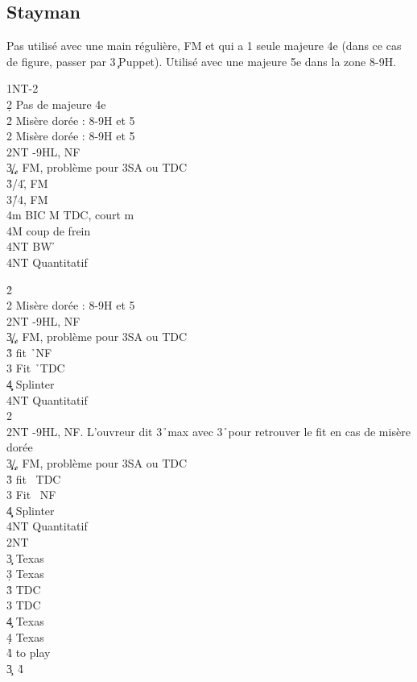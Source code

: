 \documentclass[a4paper]{article}
\begin{document}
\subsection{Stayman}

Pas utilisé avec une main régulière, FM et qui a 1 seule majeure 4e (dans ce cas de figure, passer par 3\c\ Puppet).
Utilisé avec une majeure 5e dans la zone 8-9H.

\begin{bidtable}
1NT-2\c\\
2\d \> Pas de majeure 4e\+\\
2\h \> Misère dorée : 8-9H et 5\h \\
2\s \> Misère dorée : 8-9H et 5\s \\
2NT -9HL, NF\\
3\c\d {}\c /\d , FM, problème pour 3SA ou TDC\\
3\h {}\s /4\h , FM\\
3\s {}\h /4\s , FM\\
4m \> BIC M TDC, court m\+\\
4M \> coup de frein\\
4NT \> BW \h \-\\
4NT \> Quantitatif\-
\end{bidtable}

\begin{bidtable}
2\h\+\\
2\s \> Misère dorée : 8-9H et 5\s \\
2NT -9HL, NF\\
3\c\d {}\c /\d , FM, problème pour 3SA ou TDC\\
3\h \> fit \h\ NF\\
3\s \> Fit \h\ TDC\\
4\c\d \> Splinter\\
4NT \> Quantitatif\-\\
2\s\+\\
2NT -9HL, NF. L'ouvreur dit 3\h\ max avec 3\h\ pour retrouver le fit en cas de misère dorée\\
3\c\d {}\c /\d , FM, problème pour 3SA ou TDC\\
3\h \> fit \s\ TDC\\
3\s \> Fit \s\ NF\\
4\c\d \> Splinter\\
4NT \> Quantitatif\-\\
2NT\+\\
3\c \> Texas \h \\
3\d \> Texas \s \\
3\h \> TDC\\
3\s \> TDC\\
4\c \> Texas \h \\
4\d \> Texas \s \\
4\h\s \> to play\-\\
3\c {}\s\ 4\h 
\end{bidtable}
\end{document}
